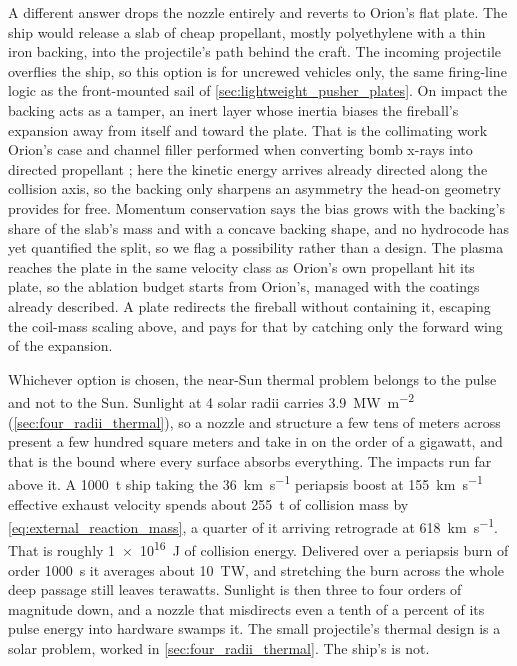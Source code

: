 \documentclass{article}
\begin{document}
A different answer drops the nozzle entirely and reverts to Orion's flat plate. The ship would release a slab of cheap propellant, mostly polyethylene with a thin iron backing, into the projectile's path behind the craft. The incoming projectile overflies the ship, so this option is for uncrewed vehicles only, the same firing-line logic as the front-mounted sail of \autoref{sec:lightweight_pusher_plates}. On impact the backing acts as a tamper, an inert layer whose inertia biases the fireball's expansion away from itself and toward the plate. That is the collimating work Orion's case and channel filler performed when converting bomb x-rays into directed propellant \cite{balcomb1970nuclear}; here the kinetic energy arrives already directed along the collision axis, so the backing only sharpens an asymmetry the head-on geometry provides for free. Momentum conservation says the bias grows with the backing's share of the slab's mass \cite{gurney1943fragments} and with a concave backing shape, and no hydrocode has yet quantified the split, so we flag a possibility rather than a design. The plasma reaches the plate in the same velocity class as Orion's own propellant hit its plate, so the ablation budget starts from Orion's, managed with the coatings already described. A plate redirects the fireball without containing it, escaping the coil-mass scaling above, and pays for that by catching only the forward wing of the expansion.

Whichever option is chosen, the near-Sun thermal problem belongs to the pulse and not to the Sun. Sunlight at 4 solar radii carries \SI{3.9}{\mega\watt\per\square\meter} (\autoref{sec:four_radii_thermal}), so a nozzle and structure a few tens of meters across present a few hundred square meters and take in on the order of a gigawatt, and that is the bound where every surface absorbs everything. The impacts run far above it. A \SI{1000}{\tonne} ship taking the \SI{36}{\kilo\meter\per\second} periapsis boost at \SI{155}{\kilo\meter\per\second} effective exhaust velocity spends about \SI{255}{\tonne} of collision mass by \autoref{eq:external_reaction_mass}, a quarter of it arriving retrograde at \SI{618}{\kilo\meter\per\second}. That is roughly \SI{1e16}{\joule} of collision energy. Delivered over a periapsis burn of order \SI{1000}{\second} it averages about \SI{10}{\tera\watt}, and stretching the burn across the whole deep passage still leaves terawatts. Sunlight is then three to four orders of magnitude down, and a nozzle that misdirects even a tenth of a percent of its pulse energy into hardware swamps it. The small projectile's thermal design is a solar problem, worked in \autoref{sec:four_radii_thermal}. The ship's is not.
\end{document}
